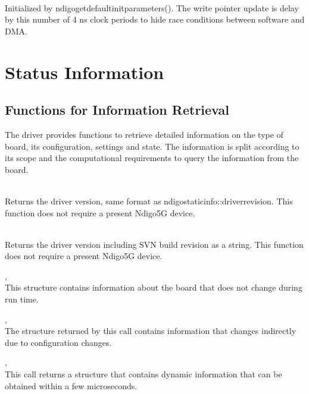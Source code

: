 			\\
			Initialized by \textsf{ndigo\tu get\tu default\tu init\tu parameters()}. The write pointer update is delay by this number of 4 ns clock periods to hide race conditions between software and DMA.

	\clearpage
	\section{Status Information}
		\subsection{Functions for Information Retrieval}
		
			The driver provides functions to retrieve detailed information on the type of board, its configuration, settings and state. The information is split according to its scope and the computational requirements to query the information from the board.\par
			
			\\
			Returns the driver version, same format as ndigo\tu static\tu info::driver\tu revision. This function does not require a
			present Ndigo5G device.

			\\
			Returns the driver version including SVN build revision as a string. This function does not require a
			present Ndigo5G device.
			
			,\\
			This structure contains information about the board that does not change during run time.\par

			, \\
			The structure returned by this call contains information that changes indirectly due to configuration changes.\par

			, \\
			This call returns a structure that contains dynamic information that can be obtained within a few microseconds.\par


